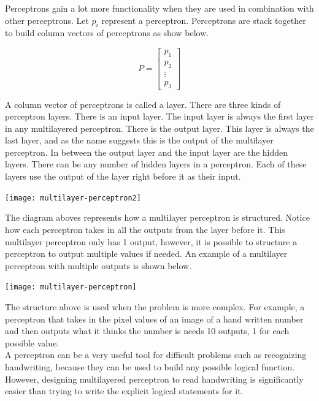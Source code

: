 Perceptrons gain a lot more functionality when they are used in combination with other perceptrons. Let $p_i$ represent a perceptron. Perceptrons are stack together to build column vectors of perceptrons as show below.

$$
	P = \begin{bmatrix}
		p_1 \\
		p_2 \\
		\vdots \\
		p_3
	\end{bmatrix}
$$

A column vector of perceptrons is called a layer. There are three kinds of perceptron layers. There is an input layer. The input layer is always the first layer in any multilayered perceptron. There is the output layer. This layer is always the last layer, and as the name suggests this is the output of the multilayer perceptron. In between the output layer and the input layer are the hidden layers. There can be any number of hidden layers in a perceptron. Each of these layers use the output of the layer right before it as their input.

\begin{center}
	\texttt{[image: multilayer-perceptron2]}
\end{center}

The diagram aboves represents how a multilayer perceptron is structured. Notice how each perceptron takes in all the outputs from the layer before it. This multilayer perceptron only has 1 output, however, it is possible to structure a perceptron to output multiple values if needed. An example of a multilayer perceptron with multiple outputs is shown below.

\begin{center}
	\texttt{[image: multilayer-perceptron]}
\end{center}

The structure above is used when the problem is more complex. For example, a perceptron that takes in the pixel values of an image of a hand written number and then outputs what it thinks the number is needs 10 outputs, 1 for each possible value. \\

A perceptron can be a very useful tool for difficult problems such as recognizing handwriting, because they can be used to build any possible logical function. However, designing multilayered perceptron to read handwriting is significantly easier than trying to write the explicit logical statements for it.

